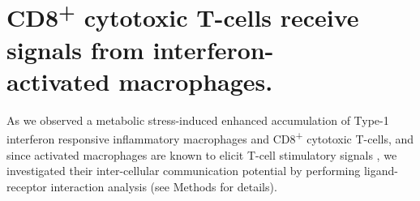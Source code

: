 
\clearpage

\section{CD8\textsuperscript{+} cytotoxic T-cells receive signals from interferon-\\activated macrophages.}
\label{sec:cell_cell}

As we observed a metabolic stress-induced enhanced accumulation of Type-1 interferon responsive inflammatory macrophages and CD8\textsuperscript{+} cytotoxic T-cells, and since activated macrophages are known to elicit T-cell stimulatory signals \textbf{\cite{}}, we investigated their inter-cellular communication potential by performing ligand-receptor interaction analysis (see Methods for details).



